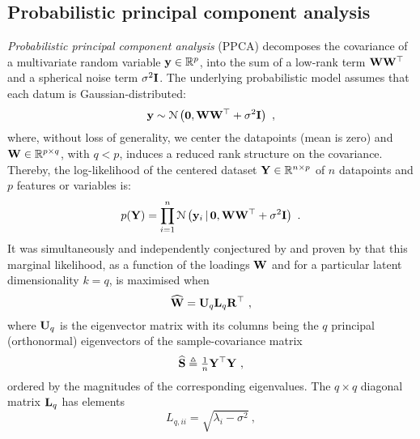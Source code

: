     \subsection{Probabilistic principal component analysis} \label{subsec:chap3_PPCA}
      \textit{Probabilistic principal component analysis} (PPCA) decomposes the covariance of a multivariate random variable $\mathbf{y} \in \mathbb{R}^p$, into the sum of a low-rank term $\mathbf{W}\mathbf{W}^\top$ and a spherical noise term $\sigma^2\mathbf{I}$. The underlying probabilistic model assumes that each datum is Gaussian-distributed:
      \begin{equation} \label{equ:chap3_pca_marginal_y}
	\mathbf{y} \sim \mathcal{N} \left( \mathbf{0}, \mathbf{W}\mathbf{W}^\top + \sigma^2 \mathbf{I} \right) ~,
      \end{equation}
      where, without loss of generality, we center the datapoints (mean is zero) and $\mathbf{W} \in \mathbb{R}^{p\times q}$, with $q < p$, induces a reduced rank structure on the covariance. Thereby, the log-likelihood of the centered dataset $\mathbf{Y} \in \mathbb{R}^{n \times p}$ of $n$ datapoints and $p$ features or variables is:
      \begin{equation} \label{equ:chap3_pca_marginal_Y}
	p(\mathbf{Y}) = \prod_{i=1}^n \mathcal{N} \left(  \mathbf{y}_i \,|\, \mathbf{0} ,  \mathbf{W}\mathbf{W}^\top + \sigma^2 \mathbf{I} \right) ~.
      \end{equation}
      It was simultaneously and independently conjectured by \citet{Roweis:SPCA97} and proven by \citet{Tipping:ppca96} that this marginal likelihood, as a function of the loadings $\mathbf{W}$ and for a particular latent dimensionality $k=q$, is maximised when
      \begin{equation} \label{equ:chap3_pca_solution}
	\widehat{\mathbf{W}} = \mathbf{U}_q \mathbf{L}_q \mathbf{R}^\top ~,
      \end{equation}
      where $\mathbf{U}_q$ is the eigenvector matrix with its columns being the $q$ principal (orthonormal) eigenvectors of the sample-covariance matrix
      \[
	\widehat{\mathbf{S}} \triangleq \tfrac{1}{n} \mathbf{Y}^\top \mathbf{Y} ~,
      \]
      ordered by the magnitudes of the corresponding eigenvalues. The $q \times q$ diagonal matrix $\mathbf{L}_q$ has elements
      \begin{equation} \label{equ:chap3_ppca_eigenv}
	L_{q,ii} = \sqrt{ \lambda_i - \sigma^2 } ~,
      \end{equation}
